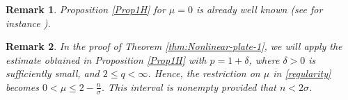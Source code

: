 \documentclass[10pt]{article}
\newtheorem{lemma}{Lemma}[section]
\newtheorem{remark}{Remark}[section]
\newcommand{\<}{\langle}
\renewcommand{\>}{\rangle}
\numberwithin{equation}{section}
\begin{document}
\begin{remark}
Proposition \ref{Prop1H} for $\mu=0$ is already well known (see for instance \cite{Ebert-L}).
\end{remark}
\begin{remark}
In the proof of Theorem \ref{thm:Nonlinear-plate-1}, we will apply the estimate obtained in Proposition \ref{Prop1H} with $p=1+\delta$, where $\delta>0$ is sufficiently small, and $2\leq q<\infty$. Hence, the restriction on $\mu$ in \eqref{regularity} becomes $0<\mu\leq 2-\frac{n}{\sigma}$. This interval is nonempty provided that $n<2\sigma$.
\end{remark}
%
\end{document}
